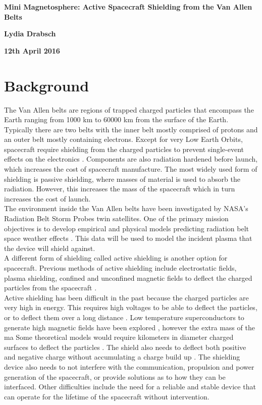 \documentclass[12pt,a4paper]{article}
\begin{document}
{\centering\bf\LARGE\color{titlecolour} Mini Magnetosphere: Active Spacecraft Shielding from the Van Allen Belts    \par} %
{\centering\bf Lydia Drabsch\par}
{\bf\centering 12th April 2016\par}



\section*{Background}
The Van Allen belts are regions of trapped charged particles that encompass the Earth ranging from 1000 km to 60000 km from the surface of the Earth. Typically there are two belts with the inner belt mostly comprised of protons and an outer belt mostly containing electrons. Except for very Low Earth Orbits, spacecraft require shielding from the charged particles to prevent single-event effects on the electronics \cite{VanAllen}. Components are also radiation hardened before launch, which increases the cost of spacecraft manufacture. The most widely used form of shielding is passive shielding, where masses of material is used to absorb the radiation. However, this increases the mass of the spacecraft which in turn increases the cost of launch.\\

The environment inside the Van Allen belts have been investigated by NASA's Radiation Belt Storm Probes twin satellites. One of the primary mission objectives is to develop empirical and physical models predicting radiation belt space weather effects \cite{RBSP}. This data will be used to model the incident plasma that the device will shield against.\\

A different form of shielding called active shielding is another option for spacecraft. Previous methods of active shielding include electrostatic fields, plasma shielding, confined and unconfined magnetic fields to deflect the charged particles from the spacecraft \cite{townsend}.\\

Active shielding has been difficult in the past because the charged particles are very high in energy. This requires high voltages to be able to deflect the particles, or to deflect them over a long distance \cite{mainweb}. Low temperature superconductors to generate high magnetic fields have been explored \cite{magthesis}, however the extra mass of the ma
Some theoretical models would require kilometers in diameter charged surfaces to deflect the particles \cite{townsend}. The shield also needs to deflect both positive and negative charge without accumulating a charge build up \cite{PlasmaRadShielding}. The shielding device also needs to not interfere with the communication, propulsion and power generation of the spacecraft, or provide solutions as to how they can be interfaced. Other difficulties include the need for a reliable and stable device that can operate for the lifetime of the spacecraft without intervention. 
\end{document}
